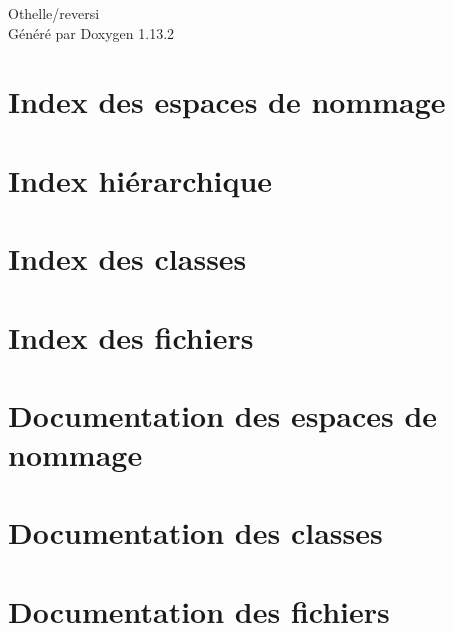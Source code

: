 \documentclass[twoside]{book}
\newcommand{\+}{\discretionary{\mbox{\scriptsize$\hookleftarrow$}}{}{}}
\newcommand{\clearemptydoublepage}{%
    \newpage{\pagestyle{empty}\cleardoublepage}%
  }
\begin{document}
  \raggedbottom
    \hypersetup{pageanchor=false,
                bookmarksnumbered=true,
                pdfencoding=unicode
               }
  \begin{titlepage}
  \vspace*{7cm}
  \begin{center}%
  {\Large Othelle/reversi}\\
  \vspace*{1cm}
  {\large Généré par Doxygen 1.13.2}\\
  \end{center}
  \end{titlepage}
  \clearemptydoublepage
  \tableofcontents
  \clearemptydoublepage
  \hypersetup{pageanchor=true}
\chapter{Index des espaces de nommage}

\chapter{Index hiérarchique}

\chapter{Index des classes}

\chapter{Index des fichiers}

\chapter{Documentation des espaces de nommage}


\chapter{Documentation des classes}










\chapter{Documentation des fichiers}









  \backmatter
  \newpage
  \clearemptydoublepage
  \printindex
\end{document}
